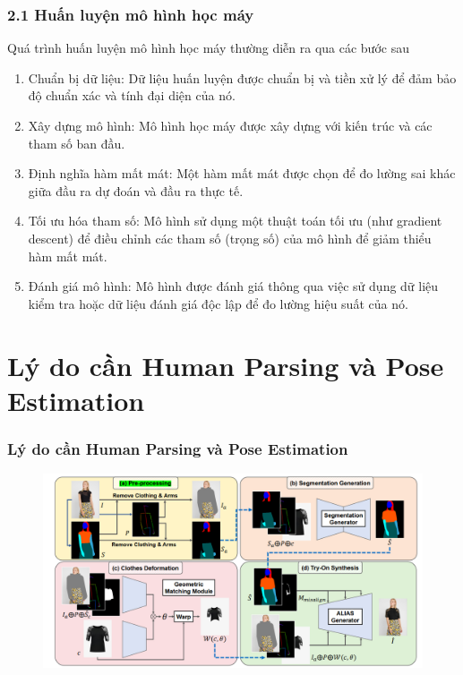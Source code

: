 \documentclass{beamer}
\begin{document}
\begin{frame}
\frametitle{2.1 Huấn luyện mô hình học máy}

Quá trình huấn luyện mô hình học máy thường diễn ra qua các bước sau

\begin{enumerate}
    \item Chuẩn bị dữ liệu: Dữ liệu huấn luyện được chuẩn bị và tiền xử lý để đảm bảo độ chuẩn xác và tính đại diện của nó.
    \item Xây dựng mô hình: Mô hình học máy được xây dựng với kiến trúc và các tham số ban đầu.
    \item Định nghĩa hàm mất mát: Một hàm mất mát được chọn để đo lường sai khác giữa đầu ra dự đoán và đầu ra thực tế.
    \item Tối ưu hóa tham số: Mô hình sử dụng một thuật toán tối ưu (như gradient descent) để điều chỉnh các tham số (trọng số) của mô hình để giảm thiểu hàm mất mát.
    \item Đánh giá mô hình: Mô hình được đánh giá thông qua việc sử dụng dữ liệu kiểm tra hoặc dữ liệu đánh giá độc lập để đo lường hiệu suất của nó.
\end{enumerate}

\end{frame}


\section{Lý do cần Human Parsing và Pose Estimation} 

\begin{frame}
\frametitle{Lý do cần Human Parsing và Pose Estimation}
\begin{figure}
    \centering
    \includegraphics[width=1\linewidth]{image.png}
    
\end{figure}


\end{frame}
\end{document}
